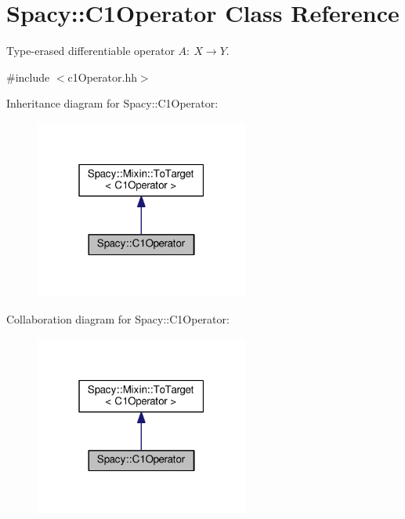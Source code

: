 \hypertarget{classSpacy_1_1C1Operator}{}\section{Spacy\+:\+:C1\+Operator Class Reference}
\label{classSpacy_1_1C1Operator}


Type-\/erased differentiable operator $A:\ X \to Y $.  




{\ttfamily \#include $<$c1\+Operator.\+hh$>$}



Inheritance diagram for Spacy\+:\+:C1\+Operator\+:\nopagebreak
\begin{figure}[H]
\begin{center}
\leavevmode
\includegraphics[width=199pt]{classSpacy_1_1C1Operator__inherit__graph}
\end{center}
\end{figure}


Collaboration diagram for Spacy\+:\+:C1\+Operator\+:\nopagebreak
\begin{figure}[H]
\begin{center}
\leavevmode
\includegraphics[width=199pt]{classSpacy_1_1C1Operator__coll__graph}
\end{center}
\end{figure}
